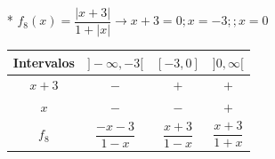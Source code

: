 {\begin{proofw}
\begin{itemize}
				\begin{table}[H]
					\centering
					\begin{tabular}{|c|c|c|c|c|}
					\hline
					Intervalos & $]-\infty, -2]$ & $]-2,-1[$&$]-1,2[$ & $[2, \infty[$ \\ \hline
					$x^2-4$ & $+$ &  $-$ & $-$ & $+$\\ \hline	
					$|x^2-4|$ & $x^2-4$ &  $-x^2+4$ & $-x^2+4$ & $x^2-4$\\ \hline
					$x+1$ & $-$ &  $-$ & $+$ & $+$\\ \hline
					$x+1$ & $-x-1$ &  $-x-1$ & $x+1$ & $x+1$\\ \hline
					$f_7$ & $-\dfrac{x^2-4}{x+1}$ &  $\dfrac{x^2-4}{x+1}$ & $-\dfrac{x^2-4}{x+1}$ & $\dfrac{x^2-4}{x+1}$\\ \hline
					
					\end{tabular}
				\end{table} 
			
				\begin{equation*}
					f_7(x)=
					\begin{cases} 
					\;  -\dfrac{x^2-4}{x+1} &\mbox{si } x\le -2 \\ 
					\; \dfrac{x^2-4}{x+1} &\mbox{si } -2<x< -1 \\
					\;  -\dfrac{x^2-4}{x+1} &\mbox{si } -1<x<2 \\ 
					\; \dfrac{x^2-4}{x+1} &\mbox{si } x\ge 2
					\end{cases}
				\end{equation*}
				
			\item[*] $f_8(x)=\dfrac {|x+3|}{1+|x|} \to x+3=0; x=-3; ; x=0$
		
				\begin{multicols}{2} 
			
				\begin{table}[H]
					\centering
					\begin{tabular}{|c|c|c|c|}
					\hline
					Intervalos & $]-\infty, -3[$ & $[-3,0]$ & $]0, \infty[$ \\ \hline
					$x+3$ & $-$ &  $+$ & $+$ \\ \hline	
					$x$   &  $-$  &  $-$  &  $+$ \\ \hline
					$f_8$   &  $\dfrac {-x-3}{1-x}$  &  $\dfrac {x+3}{1-x}$  &  $\dfrac {x+3}{1+x}$ \\ \hline
					\end{tabular}
				\end{table}
			

\end{multicols}
\end{itemize}
\end{proofw}}
